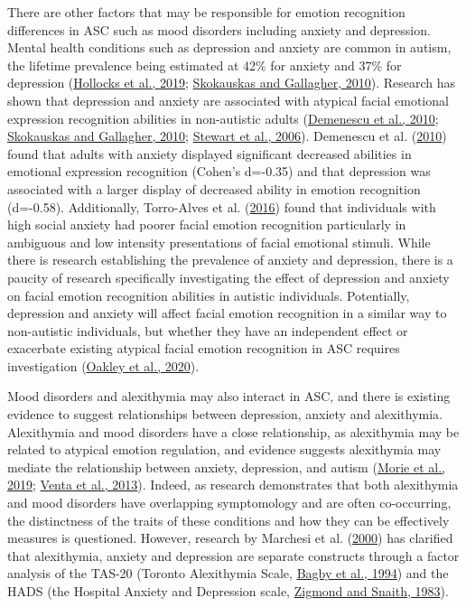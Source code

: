 \documentclass[
]{article}
\begin{document}
There are other factors that may be responsible for emotion recognition differences in ASC such as mood disorders including anxiety and depression. Mental health conditions such as depression and anxiety are common in autism, the lifetime prevalence being estimated at 42\% for anxiety and 37\% for depression (\protect\hyperlink{ref-hollocks2019a}{Hollocks et al., 2019}; \protect\hyperlink{ref-skokauskas2010a}{Skokauskas and Gallagher, 2010}). Research has shown that depression and anxiety are associated with atypical facial emotional expression recognition abilities in non-autistic adults (\protect\hyperlink{ref-demenescu2010a}{Demenescu et al., 2010}; \protect\hyperlink{ref-skokauskas2010a}{Skokauskas and Gallagher, 2010}; \protect\hyperlink{ref-stewart2006a}{Stewart et al., 2006}). Demenescu et al. (\protect\hyperlink{ref-demenescu2010a}{2010}) found that adults with anxiety displayed significant decreased abilities in emotional expression recognition (Cohen's d=-0.35) and that depression was associated with a larger display of decreased ability in emotion recognition (d=-0.58). Additionally, Torro-Alves et al. (\protect\hyperlink{ref-torro-alves2016a}{2016}) found that individuals with high social anxiety had poorer facial emotion recognition particularly in ambiguous and low intensity presentations of facial emotional stimuli. While there is research establishing the prevalence of anxiety and depression, there is a paucity of research specifically investigating the effect of depression and anxiety on facial emotion recognition abilities in autistic individuals. Potentially, depression and anxiety will affect facial emotion recognition in a similar way to non-autistic individuals, but whether they have an independent effect or exacerbate existing atypical facial emotion recognition in ASC requires investigation (\protect\hyperlink{ref-oakley2020a}{Oakley et al., 2020}).

Mood disorders and alexithymia may also interact in ASC, and there is existing evidence to suggest relationships between depression, anxiety and alexithymia. Alexithymia and mood disorders have a close relationship, as alexithymia may be related to atypical emotion regulation, and evidence suggests alexithymia may mediate the relationship between anxiety, depression, and autism (\protect\hyperlink{ref-morie2019a}{Morie et al., 2019}; \protect\hyperlink{ref-venta2013a}{Venta et al., 2013}). Indeed, as research demonstrates that both alexithymia and mood disorders have overlapping symptomology and are often co-occurring, the distinctness of the traits of these conditions and how they can be effectively measures is questioned. However, research by Marchesi et al. (\protect\hyperlink{ref-marchesi2000a}{2000}) has clarified that alexithymia, anxiety and depression are separate constructs through a factor analysis of the TAS-20 (Toronto Alexithymia Scale, \protect\hyperlink{ref-bagby1994a}{Bagby et al., 1994}) and the HADS (the Hospital Anxiety and Depression scale, \protect\hyperlink{ref-zigmond1983a}{Zigmond and Snaith, 1983}).
\end{document}
